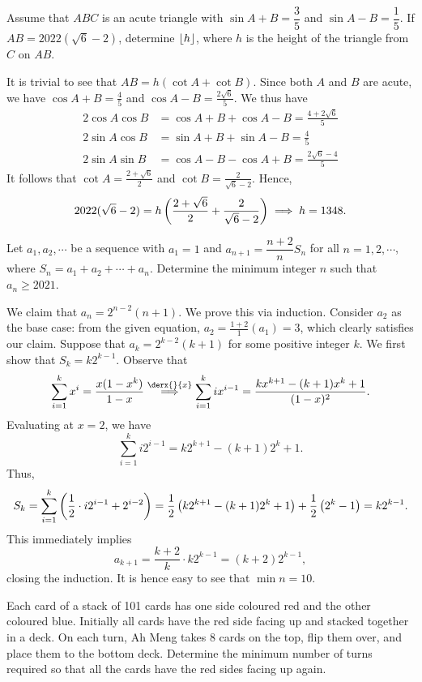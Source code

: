 \begin{question}[1348]\label{A::2021-O-1-15}
    Assume that $ABC$ is an acute triangle with $\sin{A + B} = \dfrac35$ and $\sin{A-B} = \dfrac15$. If $AB = 2022(\sqrt6 - 2)$, determine $\left\lfloor h \right\rfloor$, where $h$ is the height of the triangle from $C$ on $AB$.
\end{question}

It is trivial to see that $AB = h(\cot A + \cot B)$. Since both $A$ and $B$ are acute, we have $\cos{A+B} = \frac45$ and $\cos{A-B} = \frac{2\sqrt{6}}{5}$. We thus have
\begin{align*}
    2\cos A \cos B &= \cos{A + B} + \cos{A - B} = \frac{4 + 2\sqrt6}{5}\\
    2\sin A \cos B &= \sin{A + B} + \sin{A - B} = \frac45\\
    2\sin A \sin B &= \cos{A-B} - \cos{A+ B} = \frac{2\sqrt6 - 4}{5}
\end{align*}
It follows that $\cot A = \frac{2 + \sqrt6}{2}$ and $\cot B = \frac{2}{\sqrt6 - 2}$. Hence, \[2022(\sqrt 6 - 2) = h\left( \frac{2 + \sqrt6}{2} + \frac{2}{\sqrt6 - 2} \right) \implies h = 1348.\]

\begin{question}[10]\label{A::2021-O-1-16}
    Let $a_1, a_2, \cdots$ be a sequence with $a_1 = 1$ and $a_{n+1} = \dfrac{n+2}{n} S_n$ for all $n = 1, 2, \cdots$, where $S_n = a_1 + a_2 + \cdots + a_n$. Determine the minimum integer $n$ such that $a_n \geq 2021$.
\end{question}

We claim that $a_n = 2^{n-2} (n+1)$. We prove this via induction. Consider $a_2$ as the base case: from the given equation, $a_2 = \frac{1+2}{1}(a_1) = 3$, which clearly satisfies our claim. Suppose that $a_k = 2^{k-2} (k+1)$ for some positive integer $k$. We first show that $S_k = k2^{k-1}$. Observe that \[\sum_{i=1}^k x^i = \frac{x(1-x^k)}{1-x} \overset{\derx{}{x}}{\implies} \sum_{i = 1}^k ix^{i-1} = \frac{kx^{k+1} - (k+1)x^k + 1}{(1-x)^2}.\] Evaluating at $x = 2$, we have \[\sum_{i = 1}^k i2^{i-1} = k2^{k+1} - (k+1)2^k +1.\] Thus, \[S_k = \sum_{i=1}^k \left( \frac12 \cdot i2^{i-1} + 2^{i-2} \right) = \frac12\left( k2^{k+1} - (k+1)2^k +1 \right) + \frac12 \left( 2^k - 1 \right) = k2^{k-1}.\] This immediately implies \[a_{k+1} = \frac{k+2}{k} \cdot k2^{k-1} = (k+2)2^{k-1},\] closing the induction. It is hence easy to see that $\min n = 10$.

\begin{question}[101]\label{A::2021-O-1-17}
    Each card of a stack of 101 cards has one side coloured red and the other coloured blue. Initially all cards have the red side facing up and stacked together in a deck. On each turn, Ah Meng takes 8 cards on the top, flip them over, and place them to the bottom deck. Determine the minimum number of turns required so that all the cards have the red sides facing up again.
\end{question}

